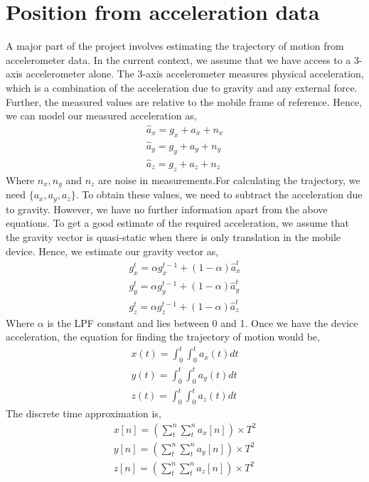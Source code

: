\documentclass[BTech]{iitmdiss}
\begin{document}
\section{Position from acceleration data}
\label{basic_theory:accel}
A major part of the project involves estimating the trajectory of motion
from accelerometer data. In the current context, we assume that we have
access to a 3-axis accelerometer alone. The 3-axis accelerometer 
measures physical acceleration, which is a combination of the 
acceleration due to gravity and any external force. Further, the 
measured values are relative to the mobile frame of reference. Hence, 
we can model our measured acceleration as,
\begin{align*}
\hat{a}_x= g_x + a_x + n_x\\
\hat{a}_y= g_y + a_y + n_y\\
\hat{a}_z= g_z + a_z + n_z
\end{align*}
Where $n_x, n_y$ and $n_z$ are noise in measurements.For calculating
 the trajectory, we need $\{a_x,a_y,a_z\}$. To obtain 
these values, we need to subtract the acceleration due to gravity. 
However, we have no further information apart from the above equations.
To get a good estimate of the required acceleration, we assume that the
gravity vector is quasi-static when there is only translation in the 
mobile device. Hence, we estimate our gravity vector as,
\begin{align*}
g_x^t= \alpha{g_x^{t-1}} + (1-\alpha)\hat{a}_x^t\\
g_y^t= \alpha{g_y^{t-1}} + (1-\alpha)\hat{a}_y^t\\
g_z^t= \alpha{g_z^{t-1}} + (1-\alpha)\hat{a}_z^t
\end{align*}
Where $\alpha$ is the LPF constant and lies between 0 and 1. 
Once we have the device acceleration, the equation for finding the 
trajectory of motion would be,
\begin{align*}
x(t)=\int_0^{t}\int_0^{t}{a_x(t)dt}\\
y(t)=\int_0^{t}\int_0^{t}{a_y(t)dt}\\
z(t)=\int_0^{t}\int_0^{t}{a_z(t)dt}
\end{align*}
The discrete time approximation is,
\begin{align*}
x[n]=({\sum_{t}^{n}}{\sum_{t}^{n}}a_x[n]){\times}T^2\\
y[n]=({\sum_{t}^{n}}{\sum_{t}^{n}}a_y[n]){\times}T^2\\
z[n]=({\sum_{t}^{n}}{\sum_{t}^{n}}a_z[n]){\times}T^2
\end{align*}
\end{document}
